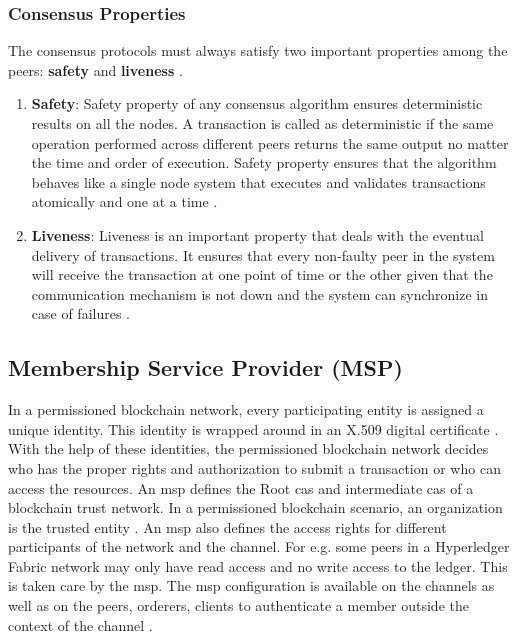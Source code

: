 \documentclass[
  a4paper,  %
  twoside,  %
  bibliography=totoc,
  headsepline,
  cleardoublepage=empty,
  parskip=half,
  draft=false
]{scrbook}
\begin{document}
\subsubsection{Consensus Properties}
The consensus protocols must always satisfy two important properties among the peers: \textbf{safety} and \textbf{liveness} \cite{HW1}.
\begin{enumerate}
\item \textbf{Safety}: Safety property of any consensus algorithm ensures deterministic results on all the nodes. A transaction is called as deterministic if the same operation performed across different peers returns the same output no matter the time and order of execution. Safety property ensures that the algorithm behaves like a single node system that executes and validates transactions atomically and one at a time \cite{HW1}.

\item \textbf{Liveness}: Liveness is an important property that deals with the eventual delivery of transactions. It ensures that every non-faulty peer in the system will receive the transaction at one point of time or the other given that the communication mechanism is not down and the system can synchronize in case of failures \cite{HW1}.
\end{enumerate}



\subsection{Membership Service Provider (MSP)}
In a permissioned blockchain network, every participating entity is assigned a unique identity. This identity is wrapped around in an X.509 digital certificate \cite{Identity}. With the help of these identities, the permissioned blockchain network decides who has the proper rights and authorization to submit a transaction or who can access the resources. An \gls{msp} defines the Root \glspl{ca} and intermediate \glspl{ca} of a blockchain trust network. In a permissioned blockchain scenario, an organization is the trusted entity \cite{Membership}. An \gls{msp} also defines the access rights for different participants of the network and the channel. For e.g. some peers in a Hyperledger Fabric network may only have read access and no write access to the ledger. This is taken care by the \gls{msp}. The \gls{msp} configuration is available on the channels as well as on the peers, orderers, clients to authenticate a member outside the context of the channel \cite{Membership}.
\end{document}
